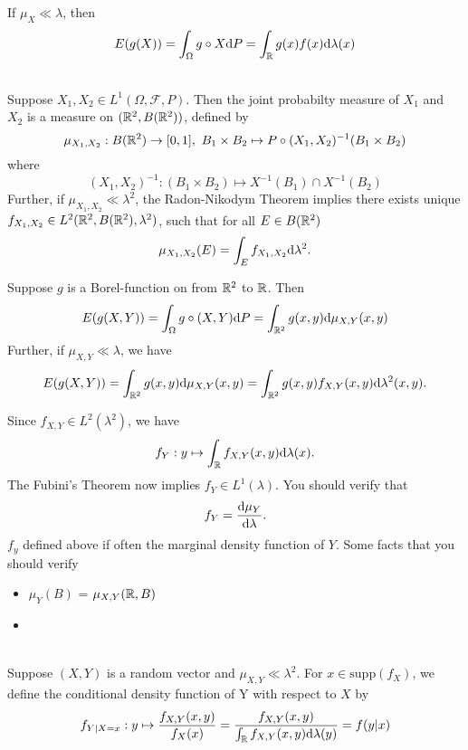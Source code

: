 \begin{proposition}
If $\mu_X \ll \lambda$, then
$$
E(g(X))=\int_\Omega g \circ X \mathrm{d} P = \int_{\mathbb{R}} g(x)f(x) \mathrm{d} \lambda (x)
$$

\end{proposition}


\begin{definition} \ \\
Suppose $X_1,X_2 \in L^1(\Omega,\mathcal F,P)$. Then the joint probabilty measure	of $X_1$ and $X_2$ is a measure on $(\mathbb{R}^2,B(\mathbb{R}^2))$, defined by
$$
\mu_{X_1,X_2} : B(\mathbb{R}^2) \to [0,1], \ B_1\times B_2 \mapsto P \circ (X_1,X_2)^{-1}(B_1\times B_2)
$$
where
$$
(X_1,X_2)^{-1}: (B_1\times B_2) \mapsto X^{-1}(B_1)\cap X^{-1}(B_2)
$$
Further, if $\mu_{X_1,X_2} \ll \lambda^2$, the Radon-Nikodym Theorem implies there exists unique $f_{X_1,X_2}\in L^2(\mathbb{R}^2,B(\mathbb{R}^2),\lambda^2)$, such that for all $E\in B(\mathbb{R}^2)$
$$
\mu_{X_1,X_2}(E) = \int_E f_{X_1,X_2} \mathrm{d} \lambda^2.
$$
\end{definition}

\begin{theorem}
Suppose $g$ is a Borel-function on from $\mathbb{R}^2$ to $\mathbb{R}$. Then 
$$
E(g(X,Y))=\int_\Omega g\circ (X,Y) \mathrm{d} P = \int_{\mathbb{R}^2} g(x,y) \mathrm{d} \mu_{X,Y}(x,y)
$$
Further, if $\mu_{X,Y} \ll \lambda$, we have
$$
E(g(X,Y))=\int_{\mathbb{R}^2} g(x,y) \mathrm{d} \mu_{X,Y}(x,y)= \int_{\mathbb{R}^2} g(x,y)f_{X,Y}(x,y)\mathrm{d} \lambda^2(x,y).
$$
\end{theorem}
Since $f_{X,Y} \in L^2(\lambda^2)$, we have
$$
f_Y :y \mapsto \int_{\mathbb{R}} f_{X,Y}(x,y)\mathrm{d} \lambda(x).
$$
The Fubini's Theorem now implies $f_Y\in L^1(\lambda)$. You should verify that 
$$
f_Y =\frac{\mathrm{d}  \mu_Y}{\mathrm{d} \lambda}.
$$
$f_y$ defined above if often the marginal density function of $Y$.
Some facts that you should verify 
\begin{itemize}
	\item $\mu_Y(B)$ = $\mu_{X,Y}(\mathbb{R},B)$
	\item 
\end{itemize}

\begin{definition} \ \\
Suppose $(X,Y)$ is a random vector and $\mu_{X,Y} \ll \lambda^2$.
For $x \in \mathrm{supp}(f_X)$, we define the conditional density function of 
Y with respect to $X$ by
	$$f_{Y|X=x}: y \mapsto \frac{f_{X,Y}(x,y)}{f_X(x)}=\frac{f_{X,Y}(x,y)}{\int_{\mathbb{R}}f_{X,Y}(x,y)\mathrm{d} \lambda(y)}=f(y|x)$$
\end{definition}

